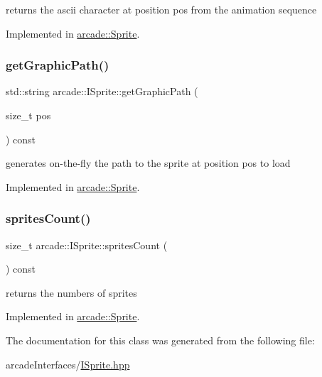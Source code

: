 returns the ascii character at position pos from the animation sequence 



Implemented in \hyperlink{classarcade_1_1_sprite_a168a7f537e0fc6d2d4596cab449fde2c}{arcade\+::\+Sprite}.

\mbox{\label{classarcade_1_1_i_sprite_ad47b6c128695746cd59e4b87435a7f09}} 
\subsubsection{\texorpdfstring{get\+Graphic\+Path()}{getGraphicPath()}}
{\footnotesize\ttfamily std\+::string arcade\+::\+I\+Sprite\+::get\+Graphic\+Path (\begin{DoxyParamCaption}\item[{size\+\_\+t}]{pos }\end{DoxyParamCaption}) const\hspace{0.3cm}{\ttfamily [pure virtual]}}



generates on-\/the-\/fly the path to the sprite at position pos to load 



Implemented in \hyperlink{classarcade_1_1_sprite_ad8f344724f99ad369c8c552274fface7}{arcade\+::\+Sprite}.

\mbox{\label{classarcade_1_1_i_sprite_aa417a93a06968e42db16f8cbd2680c89}} 
\subsubsection{\texorpdfstring{sprites\+Count()}{spritesCount()}}
{\footnotesize\ttfamily size\+\_\+t arcade\+::\+I\+Sprite\+::sprites\+Count (\begin{DoxyParamCaption}{ }\end{DoxyParamCaption}) const\hspace{0.3cm}{\ttfamily [pure virtual]}}



returns the numbers of sprites 



Implemented in \hyperlink{classarcade_1_1_sprite_a99cc47358f32492ea89659b6b92f4d4c}{arcade\+::\+Sprite}.



The documentation for this class was generated from the following file\+:\begin{DoxyCompactItemize}
\item 
arcade\+Interfaces/\hyperlink{_i_sprite_8hpp}{I\+Sprite.\+hpp}\end{DoxyCompactItemize}
